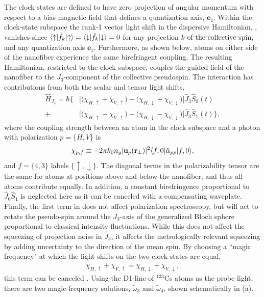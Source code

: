 \documentclass[aps,pra,twocolumn]{revtex4-1} %
\newcommand{\jz}{\hat{J}_3}
\newcommand{\magic}[1]{\tilde{\omega}_{#1}}
\begin{document}
The clock states are defined to have zero projection of angular momentum with respect to a bias magnetic field that defines a quantization axis, $\mathbf{e}_{\tilde{z}}$.  
Within the clock-state subspace the rank-1 vector light shift in the dispersive Hamiltonian, , vanishes since $\langle{\uparrow}\rvert\hat{f}_k \lvert{\uparrow}\rangle =\langle{\downarrow}\rvert\hat{f}_k \lvert{\downarrow}\rangle = 0$ for any projection $k$ \sout{of the collective spin}, and any quantization axis $\mathbf{e}_{\tilde{z}}$. 
Furthermore, as shown below, atoms on either side of the nanofiber experience the same birefringent coupling. 
The resulting Hamiltonian, restricted to the clock subspace, couples the guided field of the nanofiber to the $J_3$-component of the collective pseudospin. The interaction has contributions from both the scalar and tensor light shifts,
	\begin{align} \label{Eq::ClockHamiltonian}
		\hat{H}_{J_3} = \hbar \Big\{ & \big[ \big( \chi_{H,\uparrow} +\chi_{V,\uparrow} \big) - \big( \chi_{H,\downarrow} + \chi_{V,\downarrow}\big) \big] \jz \hat{S}_0(t) \\
		+ & \big[  \big( \chi_{H, \uparrow} - \chi_{V,\uparrow} \big) - \big(\chi_{H,\downarrow} - \chi_{V,\downarrow} \big) \big]  \jz \hat{S}_1(t) \Big\}, \nonumber
	\end{align}
where the coupling strength between an atom in the clock subspace and a photon with polarization $p = \{H,V\}$ is
	\begin{equation} \label{Eq::ClockCouplingStrength}
		\chi_{p,f} \equiv - 2\pi k_0 n_g  | \mathbf{u}_p(\mathbf{r}_\perp)|^2 \langle{f,0}\rvert\hat{\alpha}_{pp}  \lvert{f,0}\rangle,
	\end{equation}
and $f = \{4,3\}$ labels $\{\uparrow,\downarrow\}$.  
The diagonal terms in the polarizability tensor are the same for atoms at positions above and below the nanofiber, and thus all atoms contribute equally. 
In addition, a constant birefringence proportional to $ \hat{J}_0\hat{S}_1 $ is neglected here as it can be canceled with a compensating waveplate. 
Finally, the first term in  does not affect polarization spectroscopy, but will act to rotate the pseudo-spin around the $J_3$-axis of the generalized Bloch sphere proportional to classical intensity fluctuations.
While this does not affect the squeezing of projection noise in $\hat{J}_3$, it affects the metrologically relevant squeezing by adding uncertainty to the direction of the mean spin.  By choosing a ``magic frequency" at which the light shifts on the two clock states are equal, 
	\begin{align} \label{Eq::MagicWavelengthCondition}
		\chi_{H,\uparrow} +\chi_{V,\uparrow}  = \chi_{H,\downarrow} + \chi_{V,\downarrow},
	\end{align}
this term can be canceled \cite{chaudhury_continuous_2006}.
Using the D1-line of $^{133}$Cs atoms as the probe light, there are two magic-frequency solutions, $ \magic{3} $ and $\magic{4}$, shown schematically in (a).  
\end{document}
